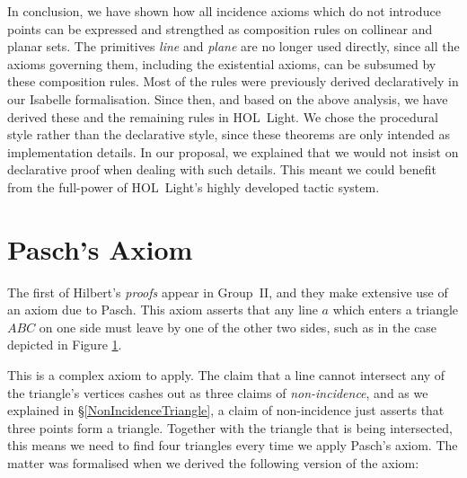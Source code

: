 In conclusion, we have shown how all incidence axioms which do not introduce points can be expressed and strengthed as composition rules on collinear and planar sets. The primitives \emph{line} and \emph{plane} are no longer used directly, since all the axioms governing them, including the existential axioms, can be subsumed by these composition rules. Most of the rules were previously derived declaratively in our Isabelle formalisation. Since then, and based on the above analysis, we have derived these and the remaining rules in HOL~Light. We chose the procedural style rather than the declarative style, since these theorems are only intended as implementation details. In our proposal, we explained that we would not insist on declarative proof when dealing with such details. This meant we could benefit from the full-power of HOL~Light's highly developed tactic system.

\section{Pasch's Axiom}
The first of Hilbert's \emph{proofs} appear in Group~II, and they make extensive use of an axiom due to Pasch. This axiom asserts that any line $a$ which enters a triangle $ABC$ on one side must leave by one of the other two sides, such as in the case depicted in Figure \ref{PaschDiagram}.

\begin{figure}\label{PaschDiagram}
\end{figure}

This is a complex axiom to apply. The claim that a line cannot intersect any of the triangle's vertices cashes out as three claims of \emph{non-incidence}, and as we explained in \S\ref{NonIncidenceTriangle}, a claim of non-incidence just asserts that three points form a triangle. Together with the triangle that is being intersected, this means we need to find four triangles every time we apply Pasch's axiom. The matter was formalised when we derived the following version of the axiom:

